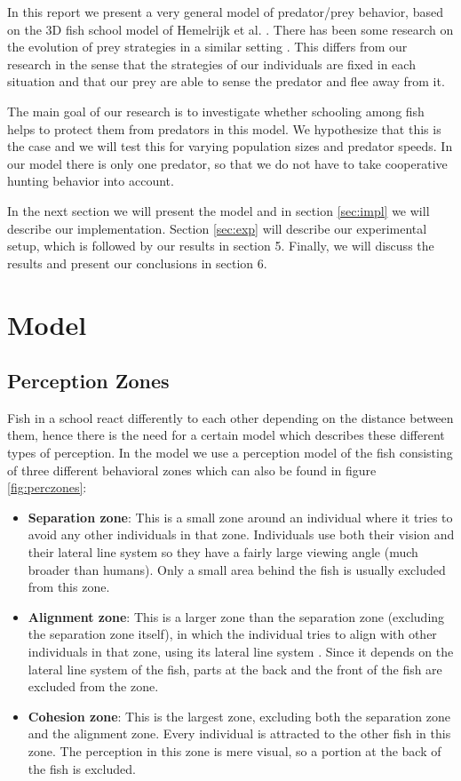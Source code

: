 \documentclass[11pt,a4paper]{article}
\begin{document}
In this report we present a very general model of predator/prey behavior, based on the 3D fish school model of Hemelrijk et al. \cite{hemelrijk}. There has been some research on the evolution of prey strategies in a similar setting \cite{kunz06}. This differs from our research in the sense that the strategies of our individuals are fixed in each situation and that our prey are able to sense the predator and flee away from it.

The main goal of our research is to investigate whether schooling among fish helps to protect them from predators in this model. We hypothesize that this is the case and we will test this for varying population sizes and predator speeds. In our model there is only one predator, so that we do not have to take cooperative hunting behavior into account.

In the next section we will present the model and in section \ref{sec:impl} we will describe our implementation. Section \ref{sec:exp} will describe our experimental setup, which is followed by our results in section 5. Finally, we will discuss the results and present our conclusions in section 6.

\section{Model}
\label{sec:model}
\subsection{Perception Zones}
Fish in a school react differently to each other depending on the distance between them, hence there is the need for a certain model which describes these different types of perception. In the model we use a perception model of the fish consisting of three different behavioral zones which can also be found in figure \ref{fig:perczones}:
\begin{itemize}
\item 
  \textbf{Separation zone}: This is a small zone around an individual where it tries to avoid any other individuals in that zone. Individuals use both their vision and their lateral line system  so they have a fairly large viewing angle (much broader than humans). Only a small area behind the fish is usually excluded from this zone.
\item
  \textbf{Alignment zone}: This is a larger zone than the separation zone (excluding the separation zone itself), in which the individual tries to align with other individuals in that zone, using its lateral line system \cite{hemelrijk}. Since it depends on the lateral line system of the fish, parts at the back and the front of the fish are excluded from the zone.
\item
  \textbf{Cohesion zone}: This is the largest zone, excluding both the separation zone and the alignment zone. Every individual is attracted to the other fish in this zone. The perception in this zone is mere visual, so a portion at the back of the fish is excluded.
\end{itemize}
\end{document}
